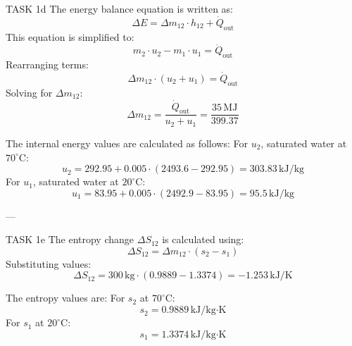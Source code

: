 TASK 1d  
The energy balance equation is written as:  
\[
\Delta E = \Delta m_{12} \cdot h_{12} + \dot{Q}_{\text{out}}
\]  
This equation is simplified to:  
\[
m_{2} \cdot u_{2} - m_{1} \cdot u_{1} = \dot{Q}_{\text{out}}
\]  
Rearranging terms:  
\[
\Delta m_{12} \cdot (u_{2} + u_{1}) = \dot{Q}_{\text{out}}
\]  
Solving for \( \Delta m_{12} \):  
\[
\Delta m_{12} = \frac{\dot{Q}_{\text{out}}}{u_{2} + u_{1}} = \frac{35 \, \text{MJ}}{399.37}
\]  

The internal energy values are calculated as follows:  
For \( u_{2} \), saturated water at \( 70^\circ\text{C} \):  
\[
u_{2} = 292.95 + 0.005 \cdot (2493.6 - 292.95) = 303.83 \, \text{kJ/kg}
\]  
For \( u_{1} \), saturated water at \( 20^\circ\text{C} \):  
\[
u_{1} = 83.95 + 0.005 \cdot (2492.9 - 83.95) = 95.5 \, \text{kJ/kg}
\]  

---

TASK 1e  
The entropy change \( \Delta S_{12} \) is calculated using:  
\[
\Delta S_{12} = \Delta m_{12} \cdot (s_{2} - s_{1})
\]  
Substituting values:  
\[
\Delta S_{12} = 300 \, \text{kg} \cdot (0.9889 - 1.3374) = -1.253 \, \text{kJ/K}
\]  

The entropy values are:  
For \( s_{2} \) at \( 70^\circ\text{C} \):  
\[
s_{2} = 0.9889 \, \text{kJ/kg·K}
\]  
For \( s_{1} \) at \( 20^\circ\text{C} \):  
\[
s_{1} = 1.3374 \, \text{kJ/kg·K}
\]